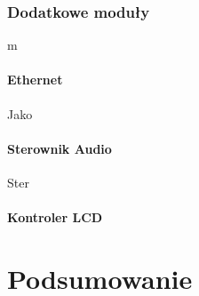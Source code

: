 \documentclass[a4paper,12pt]{book}
\begin{document}
			\subsection{Dodatkowe moduły}
				\label{sec:linux_modules}
				m
				\subsubsection{Ethernet}
					Jako
				\subsubsection{Sterownik Audio}
					Ster
				\subsubsection{Kontroler LCD}
		
	\chapter{Podsumowanie}

	
	
	
	
	
	\appendix
	
\end{document}
